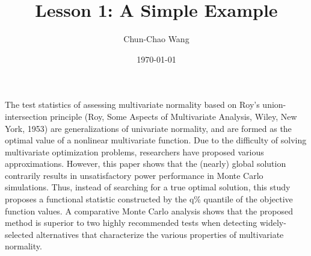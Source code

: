 \documentclass[12pt, a4paper]{article}
\title{ Lesson 1: A Simple Example}
\author{Chun-Chao Wang}
\date{\today }
\begin{document}
\maketitle
\fontsize{12}{22pt}\selectfont 	%

The test statistics of assessing multivariate normality based on Roy's union-intersection principle (Roy, Some Aspects of Multivariate Analysis, Wiley, New York, 1953) are generalizations of univariate normality, and are formed as the optimal value of a nonlinear multivariate function. Due to the difficulty of solving multivariate optimization problems, researchers have proposed various approximations. However, this paper shows that the (nearly) global solution contrarily results in unsatisfactory power performance
in Monte Carlo simulations. Thus, instead of searching for a true optimal solution, this study proposes a functional
statistic constructed by the q\% quantile of the objective function values. A comparative Monte Carlo analysis shows that the proposed method is superior to two highly recommended tests when detecting widely-selected alternatives that characterize the various properties of multivariate normality.
\end{document}

